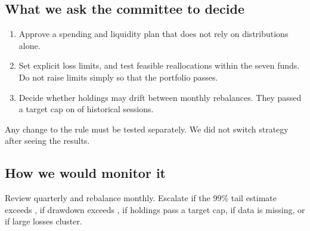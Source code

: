 \documentclass[11pt,a4paper]{article}
\begin{document}
\subsection{What we ask the committee to decide}
\begin{enumerate}
\item Approve a spending and liquidity plan that does not rely on distributions alone.
\item Set explicit loss limits, and test feasible reallocations within the seven funds. Do not raise limits simply so that the portfolio passes.
\item Decide whether holdings may drift between monthly rebalances. They passed a target cap on \qeDriftSessions{} of \qeActiveSessions{} historical sessions.
\end{enumerate}
Any change to the rule must be tested separately. We did not switch strategy after seeing the results.

\subsection{How we would monitor it}
Review quarterly and rebalance monthly. Escalate if the 99\% tail estimate exceeds \qeBudgetEs{}, if drawdown exceeds \qeBudgetDrawdown{}, if holdings pass a target cap, if data is missing, or if large losses cluster.

\end{document}

